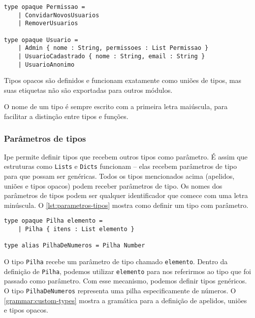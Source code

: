 \begin{lstlisting}[label={lst:type-opaque},caption={Exemplo de tipos opacos}]
type opaque Permissao =
    | ConvidarNovosUsuarios
    | RemoverUsuarios

type opaque Usuario =
    | Admin { nome : String, permissoes : List Permissao }
    | UsuarioCadastrado { nome : String, email : String }
    | UsuarioAnonimo
\end{lstlisting}

Tipos opacos são definidos e funcionam exatamente como uniões de tipos, mas suas
etiquetas não são exportadas para outros módulos.

O nome de um tipo é sempre escrito com a primeira letra maiúscula, para facilitar
a distinção entre tipos e funções.

\subsubsection{Parâmetros de tipos}

Ipe permite definir tipos que recebem outros tipos como parâmetro. É assim que
estruturas como \texttt{Lists} e \texttt{Dicts} funcionam -- elas recebem parâmetros
de tipo para que possam ser genéricas. Todos os tipos mencionados acima (apelidos,
uniões e tipos opacos) podem receber parâmetros de tipo. Os nomes dos parâmetros
de tipos podem ser qualquer identificador que comece com uma letra minúscula. O
\autoref{lst:parametros-tipos} mostra como definir um tipo com parâmetro.

\begin{lstlisting}[label={lst:parametros-tipos},caption={Exemplo de como definir um tipo com parâmetro}]
type opaque Pilha elemento =
    | Pilha { itens : List elemento }

type alias PilhaDeNumeros = Pilha Number
\end{lstlisting}

O tipo \texttt{Pilha} recebe um parâmetro de tipo chamado \texttt{elemento}. Dentro
da definição de \texttt{Pilha}, podemos utilizar \texttt{elemento} para nos referirmos
ao tipo que foi passado como parâmetro. Com esse mecanismo, podemos definir tipos
genéricos. O tipo \texttt{PilhaDeNumeros} representa uma pilha especificamente de
números. O \autoref{grammar:custom-types} mostra a gramática para a definição de
apelidos, uniões e tipos opacos.

